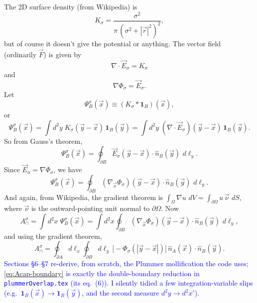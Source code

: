 \documentclass[11pt]{article}
\numberwithin{equation}{section}
\newcommand{\vv}[1]{\vec{#1}}
\newcommand{\cam}[1]{\textcolor{blue}{#1}}
\begin{document}
The 2D surface density (from Wikipedia) is
\begin{equation}\label{eq:Ksig}
  K_\sigma=\frac{\sigma^2}{\pi\,(\sigma^2+|\vv r|^2)^2},
\end{equation}
but of course it doesn't give the potential or anything. The vector field (ordinarily $\vv F$) is
given by
\begin{equation}\label{eq:divE}
  \nabla\cdot\vv E_\sigma=K_\sigma
\end{equation}
and
\begin{equation}\label{eq:gradPhi}
  \nabla\Phi_\sigma=\vv E_\sigma.
\end{equation}
Let
\begin{equation}\label{eq:PsiB-def}
  \Psi_B^\sigma(\vv x)\equiv(K_\sigma*\mathbf 1_B)(\vv x),
\end{equation}
or
\[
  \Psi_B^\sigma(\vv x)=\int\!d^2y\;K_\sigma(\vv y-\vv x)\,\mathbf 1_B(\vv y)
  =\int\!d^2y\;(\nabla\cdot\vv E_\sigma)(\vv y-\vv x)\,\mathbf 1_B(\vv y).
\]
So from Gauss's theorem,
\begin{equation}\label{eq:PsiB-gauss}
  \Psi_B^\sigma(\vv x)=\oint_{\partial B}\vv E_\sigma(\vv y-\vv x)\cdot\hat n_B(\vv y)\,\,d\ell_y.
\end{equation}
Since $\vv E_\sigma=\nabla\Phi_\sigma$, we have
\begin{equation}\label{eq:PsiB-phi}
  \Psi_B^\sigma(\vv x)=\oint_{\partial B}(\nabla_{\!\vv x}\Phi_\sigma)(\vv y-\vv x)\cdot\hat n_B(\vv y)\,\,d\ell_y.
\end{equation}
And again, from Wikipedia, the gradient theorem is
$\int_\Omega\nabla u\,\,dV=\int_{\partial\Omega}u\,\vv\nu\,\,dS$, where $\vv\nu$ is the outward-pointing
unit normal to $\partial\Omega$. Now
\[
  A_\cap^\sigma=\int\!d^2x\;\Psi_B^\sigma(\vv x)
  =\int\!d^2x\oint_{\partial B}(\nabla_{\!\vv x}\Phi_\sigma)(\vv y-\vv x)\cdot\hat n_B(\vv y)\,\,d\ell_y,
\]
and using the gradient theorem,
\begin{equation}\label{eq:Acap-boundary}
  A_\cap^\sigma=\oint_{\partial A}\!d\ell_x\oint_{\partial B}\!d\ell_y\,\big[-\Phi_\sigma(|\vv y-\vv x|)\big]\,
  \hat n_A(\vv x)\cdot\hat n_B(\vv y).
\end{equation}
\cam{Sections \S6--\S7 re-derive, from scratch, the Plummer mollification the code uses;
\eqref{eq:Acap-boundary} is exactly the double-boundary reduction in \texttt{plummerOverlap.tex}
(its eq.~(6)). I silently tidied a few integration-variable slips (e.g.\ $\mathbf 1_B(\vv x)\to\mathbf
1_B(\vv y)$, and the second measure $d^2y\to d^2x'$).}
\end{document}

